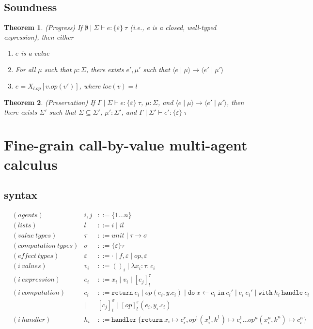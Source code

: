 \documentclass{article}
\newtheorem{theorem}{Theorem}[section]
\theoremstyle{definition}
\begin{document}
\subsection{Soundness}
\begin{theorem} (Progress) If $\emptyset \mid \Sigma \vdash e : \{\varepsilon\}\ \tau$ (i.e., e is a closed, well-typed expression), then either 
\begin{enumerate}
\item $e$ is a value
\item For all $ \mu$ such that $\mu : \Sigma$, there exists $e', \mu'$ such that $\langle e \mid \mu \rangle \longrightarrow \langle e' \mid \mu' \rangle $
\item $e = X_{l.op}[v.op(v')]$, where $loc(v) = l$
\end{enumerate}
\end{theorem}

\begin{theorem} (Preservation) If $\Gamma \mid \Sigma \vdash e : \{\varepsilon\}\ \tau$, $\mu : \Sigma$, and ${ \langle e \mid \mu \rangle \longrightarrow \langle e' \mid \mu' \rangle }$, then there exists $\Sigma'$ such that $\Sigma \subseteq \Sigma'$, $\mu' : \Sigma'$, and $\Gamma \mid \Sigma' \vdash e' : \{\varepsilon\}\ \tau$
\end{theorem}


\newpage
\section{Fine-grain call-by-value multi-agent calculus}
\subsection{syntax}
\begin{align*}
&(agents) &i, j &::= \{1 \dots n\}\\
&(lists) & l &::= i \mid il\\
&(value\ types) &\tau &::= unit \mid \tau \rightarrow \sigma\\
&(computation\ types) &\sigma &::= \{\varepsilon\}\tau\\
&(effect\ types) &\varepsilon &::= \cdot \mid f, \varepsilon \mid op, \varepsilon\\
&(i\  values) &{v_i} &::= ()_i \mid \lambda x_i:\tau.\ c_i\\
&(i\ expression) &e_i &::= x_i \mid v_i \mid [e_j]^\tau_l \\
&(i\ computation) &c_i &::= \texttt{return}\ e_i \mid op(e_i, y.c_i) \mid \texttt{do}\ x \leftarrow c_i\ \texttt{in}\ c_i' \mid e_i\ e_i' \mid \texttt{with}\ h_i\ \texttt{handle}\ c_i\\
 &\ &\mid\ &[c_j]^\sigma_l \mid [op]^\varepsilon_l (e_i, y_i.c_i)\\
&(i\ handler) &h_i &::= \texttt{handler}\ \{\texttt{return}\ x_i \mapsto c^r_i, op^1(x_i^1, k^1) \mapsto c_i^1 \dots  op^n(x_i^n, k^n) \mapsto c_i^n\}  
\end{align*}
\end{document}
